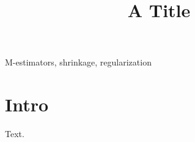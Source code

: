 \documentclass{IEEEtran}
\newcommand{\keywords}{M-estimators, shrinkage, regularization}
\begin{document}
\title{A Title}
\maketitle
\begin{IEEEkeywords}
\keywords
\end{IEEEkeywords}
\section{Intro}
Text.
\end{document}
